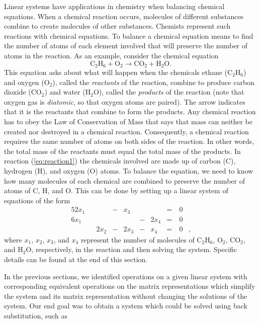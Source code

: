 Linear systems have applications in chemistry when balancing chemical equations. When a chemical reaction occurs, molecules of different substances combine to create molecules of other substances. Chemists represent such reactions with chemical equations. To balance a chemical equation means to find the number of atoms of each element involved that will preserve the number of atoms in the reaction. 
As an example, consider the chemical equation
\begin{equation}
\text{C}_2\text{H}_6 + \text{O}_2 \to \text{CO}_2 + \text{H}_2\text{O}. \label{eq:reaction1}
\end{equation}
This equation asks about what will happen when the chemicals ethane ($\text{C}_2\text{H}_6$) and oxygen ($\text{O}_2$), called the \emph{reactants} of the reaction, combine to produce carbon dioxide ($\text{CO}_2$) and water ($\text{H}_2\text{O}$), called the \emph{products} of the reaction (note that oxygen gas is \emph{diatomic}, so that oxygen atoms are paired). The arrow indicates that it is the reactants that combine to form the products. Any chemical reaction has to obey the Law of Conservation of Mass that says that mass can neither be created nor destroyed in a chemical reaction. Consequently, a chemical reaction requires the same number of atoms on both sides of the reaction. In other words, the total mass of the reactants must equal the total mass of the products. In reaction (\ref{eq:reaction1}) the chemicals involved are made up of carbon (C), hydrogen (H), and oxygen (O) atoms. To balance the equation, we need to know how many molecules of each chemical are combined to preserve the number of atoms of C, H, and O. This can be done by setting up a linear system of equations of the form 
\begin{alignat*}{5}
{2}x_1 	&{}		&{}		&{}-{}	&{}x_3	&{}		&{} 			&{}={}	& \ 0&{}   \\
{6}x_1	&{} 		&{} 		&{}		&{}		&{}-{}	&{2}x_4 	&{}={} 	& \ 0&{} \\
{}			&{}		&{2}x_2	&{}-{} 	&{2}x_3	&{}-{}	&{}x_4		&{}={} 	& \ 0&{,}
\end{alignat*}
where $x_1$, $x_2$, $x_3$, and $x_4$ represent the number of molecules of $\text{C}_2\text{H}_6$,  $\text{O}_2$,  $\text{CO}_2$, and $\text{H}_2\text{O}$, respectively, in the reaction and then solving the system. Specific details can be found at the end of this section. 

\label{sec:row_ech_intro}

In the previous sections, we identified operations on a given linear system with corresponding equivalent operations on the matrix representations which simplify the system and its matrix representation without changing the solutions of the system. Our end goal was to obtain a system which could be solved using back substitution, such as 

